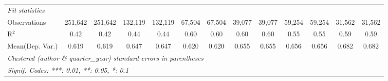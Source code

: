 \begin{tabular}{lcccccccccccc}
   \midrule
   \emph{Fit statistics}\\
   Observations                             & 251,642       & 251,642        & 132,119       & 132,119       & 67,504        & 67,504       & 39,077        & 39,077       & 59,254      & 59,254        & 31,562  & 31,562\\  
   R$^2$                                    & 0.42          & 0.42           & 0.44          & 0.44          & 0.60          & 0.60         & 0.60          & 0.60         & 0.55        & 0.55          & 0.59    & 0.59\\  
Mean(Dep. Var.) & 0.619 & 0.619 & 0.647 & 0.647 & 0.620 & 0.620 & 0.655 & 0.655 & 0.656 & 0.656 & 0.682 & 0.682 \\
   \midrule \midrule
   \multicolumn{13}{l}{\emph{Clustered (author \& quarter\_year) standard-errors in parentheses}}\\
   \multicolumn{13}{l}{\emph{Signif. Codes: ***: 0.01, **: 0.05, *: 0.1}}\\
\end{tabular}
\par\endgroup

